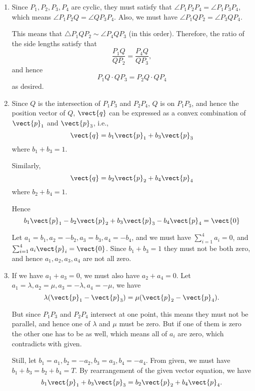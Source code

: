 \Question{\currfilebase}

\begin{enumerate}
    \item Since \(P_1, P_2, P_3, P_4\) are cyclic, they must satisfy that \(\angle P_1 P_2 P_4 = \angle P_1 P_3 P_4\), which means \(\angle P_1 P_2 Q = \angle Q P_3 P_4\). Also, we must have \(\angle P_1 Q P_2 = \angle P_3 Q P_4\).

          This means that \(\triangle P_1 Q P_2 \sim \angle P_4 Q P_3\) (in this order). Therefore, the ratio of the side lengths satisfy that
          \[
              \frac{P_1 Q}{Q P_2} = \frac{P_4 Q}{Q P_3},
          \]
          and hence
          \[
              P_1 Q \cdot QP_3 = P_2 Q \cdot QP_4
          \]
          as desired.

    \item Since \(Q\) is the intersection of \(P_1 P_3\) and \(P_2 P_4\), \(Q\) is on \(P_1 P_3\), and hence the position vector of \(Q\), \(\vect{q}\) can be expressed as a convex combination of \(\vect{p}_1\) and \(\vect{p}_3\), i.e.,
          \[
              \vect{q} = b_1 \vect{p}_1 + b_3 \vect{p}_3
          \]
          where \(b_1 + b_3 = 1\).

          Similarly,
          \[
              \vect{q} = b_2 \vect{p}_2 + b_4 \vect{p}_4
          \]
          where \(b_2 + b_4 = 1\).

          Hence
          \[
              b_1 \vect{p}_1 - b_2 \vect{p}_2 + b_3 \vect{p}_3 - b_4 \vect{p}_4 = \vect{0}
          \]

          Let \(a_1 = b_1, a_2 = -b_2, a_3 = b_3, a_4 = -b_4\), and we must have \(\sum_{i = 1}^{4} a_i = 0\), and \(\sum_{i = 1}^{4} a_i \vect{p}_i = \vect{0}\). Since \(b_1 + b_3 = 1\) they must not be both zero, and hence \(a_1, a_2, a_3, a_4\) are not all zero.

    \item If we have \(a_1 + a_3 = 0\), we must also have \(a_2 + a_4 = 0\). Let \(a_1 = \lambda, a_2 = \mu, a_3 = -\lambda, a_4 = -\mu\), we have
          \[
              \lambda(\vect{p}_1 - \vect{p}_3) = \mu(\vect{p}_2 - \vect{p}_4).
          \]

          But since \(P_1 P_3\) and \(P_2 P_4\) intersect at one point, this means they must not be parallel, and hence one of  \(\lambda\) and \(\mu\) must be zero. But if one of them is zero the other one has to be as well, which means all of \(a_i\) are zero, which contradicts with given.

          Still, let \(b_1 = a_1, b_2 = -a_2, b_3 = a_3, b_4 = -a_4\). From given, we must have \(b_1 + b_3 = b_2 + b_4 = T\). By rearrangement of the given vector equation, we have
          \[
              b_1 \vect{p}_1 + b_3 \vect{p}_3 = b_2 \vect{p}_2 + b_4 \vect{p}_4.
          \]


\end{enumerate}
